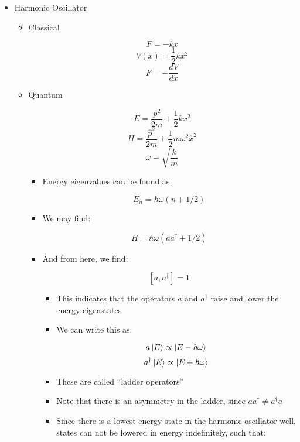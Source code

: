 \begin{itemize}

  \item Harmonic Oscillator

    \begin{itemize}

      \item Classical

        $$F=-kx$$
        $$V(x)=\frac{1}{2}kx^2$$
        $$F=-\frac{dV}{dx}$$

      \item Quantum

        $$E=\frac{p^2}{2m}+\frac{1}{2}kx^2$$
        $$H=\frac{\hat{p}^2}{2m}+\frac{1}{2}m\omega^2\hat{x}^2$$
        $$\omega=\sqrt{\frac{k}{m}}$$

        \begin{itemize}

          \item Energy eigenvalues can be found as:

            $$E_n=\hbar\omega(n+1/2)$$

          \item We may find:

            $$H=\hbar\omega(aa^{\dagger}+1/2)$$

          \item And from here, we find:

            $$[a,a^{\dagger}]=1$$

            \begin{itemize}

              \item This indicates that the operators $a$ and $a^{\dagger}$ raise and lower the energy eigenstates

              \item We can write this as:

                $$a\ket{E}\propto \ket{E-\hbar\omega}$$
                $$a^{\dagger}\ket{E}\propto \ket{E+\hbar\omega}$$

              \item These are called ``ladder operators''

              \item Note that there is an asymmetry in the ladder, since $aa^{\dagger}\neq a^{\dagger}a$

              \item Since there is a lowest energy state in the harmonic oscillator well, states can not be lowered in energy indefinitely, such that:


\end{itemize}
\end{itemize}
\end{itemize}
\end{itemize}
